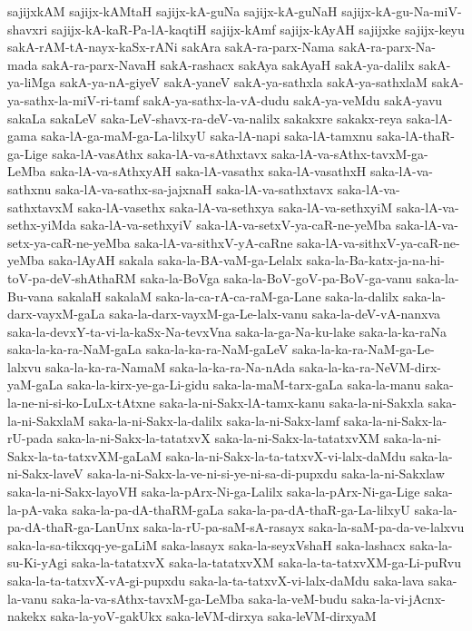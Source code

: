 {sajijxkAM
sajijx-kAMtaH
sajijx-kA-guNa
sajijx-kA-guNaH
sajijx-kA-gu-Na-miV-shavxri
sajijx-kA-kaR-Pa-lA-kaqtiH
sajijx-kAmf
sajijx-kAyAH
sajijxke
sajijx-keyu
sakA-rAM-tA-nayx-kaSx-rANi
sakAra
sakA-ra-parx-Nama
sakA-ra-parx-Na-mada
sakA-ra-parx-NavaH
sakA-rashacx
sakAya
sakAyaH
sakA-ya-dalilx
sakA-ya-liMga
sakA-ya-nA-giyeV
sakA-yaneV
sakA-ya-sathxla
sakA-ya-sathxlaM
sakA-ya-sathx-la-miV-ri-tamf
sakA-ya-sathx-la-vA-dudu
sakA-ya-veMdu
sakA-yavu
sakaLa
sakaLeV
saka-LeV-shavx-ra-deV-va-nalilx
sakakxre
sakakx-reya
saka-lA-gama
saka-lA-ga-maM-ga-La-lilxyU
saka-lA-napi
saka-lA-tamxnu
saka-lA-thaR-ga-Lige
saka-lA-vasAthx
saka-lA-va-sAthxtavx
saka-lA-va-sAthx-tavxM-ga-LeMba
saka-lA-va-sAthxyAH
saka-lA-vasathx
saka-lA-vasathxH
saka-lA-va-sathxnu
saka-lA-va-sathx-sa-jajxnaH
saka-lA-va-sathxtavx
saka-lA-va-sathxtavxM
saka-lA-vasethx
saka-lA-va-sethxya
saka-lA-va-sethxyiM
saka-lA-va-sethx-yiMda
saka-lA-va-sethxyiV
saka-lA-va-setxV-ya-caR-ne-yeMba
saka-lA-va-setx-ya-caR-ne-yeMba
saka-lA-va-sithxV-yA-caRne
saka-lA-va-sithxV-ya-caR-ne-yeMba
saka-lAyAH
sakala
saka-la-BA-vaM-ga-Lelalx
saka-la-Ba-katx-ja-na-hi-toV-pa-deV-shAthaRM
saka-la-BoVga
saka-la-BoV-goV-pa-BoV-ga-vanu
saka-la-Bu-vana
sakalaH
sakalaM
saka-la-ca-rA-ca-raM-ga-Lane
saka-la-dalilx
saka-la-darx-vayxM-gaLa
saka-la-darx-vayxM-ga-Le-lalx-vanu
saka-la-deV-vA-nanxva
saka-la-devxY-ta-vi-la-kaSx-Na-tevxVna
saka-la-ga-Na-ku-lake
saka-la-ka-raNa
saka-la-ka-ra-NaM-gaLa
saka-la-ka-ra-NaM-gaLeV
saka-la-ka-ra-NaM-ga-Le-lalxvu
saka-la-ka-ra-NamaM
saka-la-ka-ra-Na-nAda
saka-la-ka-ra-NeVM-dirx-yaM-gaLa
saka-la-kirx-ye-ga-Li-gidu
saka-la-maM-tarx-gaLa
saka-la-manu
saka-la-ne-ni-si-ko-LuLx-tAtxne
saka-la-ni-Sakx-lA-tamx-kanu
saka-la-ni-Sakxla
saka-la-ni-SakxlaM
saka-la-ni-Sakx-la-dalilx
saka-la-ni-Sakx-lamf
saka-la-ni-Sakx-la-rU-pada
saka-la-ni-Sakx-la-tatatxvX
saka-la-ni-Sakx-la-tatatxvXM
saka-la-ni-Sakx-la-ta-tatxvXM-gaLaM
saka-la-ni-Sakx-la-ta-tatxvX-vi-lalx-daMdu
saka-la-ni-Sakx-laveV
saka-la-ni-Sakx-la-ve-ni-si-ye-ni-sa-di-pupxdu
saka-la-ni-Sakxlaw
saka-la-ni-Sakx-layoVH
saka-la-pArx-Ni-ga-Lalilx
saka-la-pArx-Ni-ga-Lige
saka-la-pA-vaka
saka-la-pa-dA-thaRM-gaLa
saka-la-pa-dA-thaR-ga-La-lilxyU
saka-la-pa-dA-thaR-ga-LanUnx
saka-la-rU-pa-saM-sA-rasayx
saka-la-saM-pa-da-ve-lalxvu
saka-la-sa-tikxqq-ye-gaLiM
saka-lasayx
saka-la-seyxVshaH
saka-lashacx
saka-la-su-Ki-yAgi
saka-la-tatatxvX
saka-la-tatatxvXM
saka-la-ta-tatxvXM-ga-Li-puRvu
saka-la-ta-tatxvX-vA-gi-pupxdu
saka-la-ta-tatxvX-vi-lalx-daMdu
saka-lava
saka-la-vanu
saka-la-va-sAthx-tavxM-ga-LeMba
saka-la-veM-budu
saka-la-vi-jAcnx-nakekx
saka-la-yoV-gakUkx
saka-leVM-dirxya
saka-leVM-dirxyaM
}
